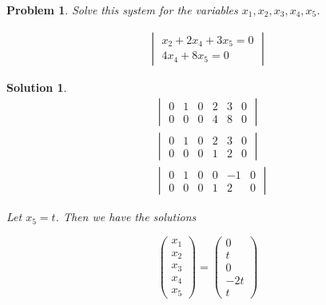 \documentclass{article}
\newtheorem{problem}{Problem}
\newtheorem*{solution}{Solution}
\begin{document}
\begin{problem}

Solve this system for the variables $x_{1}, x_{2}, x_{3}, x_{4}, x_{5}$.

\begin{align*}
\begin{vmatrix}
x_{2} + 2x_{4} + 3x_{5} = 0 \\
4x_{4} + 8x_{5} = 0
\end{vmatrix}
\end{align*}

\end{problem}

\begin{solution}
\begin{align*}
&\begin{vmatrix}
0 & 1 & 0 & 2 & 3 & 0 \\
0 & 0 & 0 & 4 & 8 & 0 
\end{vmatrix} \\
&\begin{vmatrix}
0 & 1 & 0 & 2 & 3 & 0 \\
0 & 0 & 0 & 1 & 2 & 0 
\end{vmatrix} \\
&\begin{vmatrix}
0 & 1 & 0 & 0 & -1 & 0 \\
0 & 0 & 0 & 1 & 2 & 0 
\end{vmatrix}
\end{align*}

Let $x_{5} = t$. Then we have the solutions

\begin{equation*}
\begin{pmatrix}
x_{1} \\ x_{2} \\ x_{3} \\ x_{4} \\ x_{5}
\end{pmatrix}
=
\begin{pmatrix}
0 \\ t \\ 0 \\ -2t \\ t
\end{pmatrix}
\end{equation*}


\end{solution}
\end{document}
